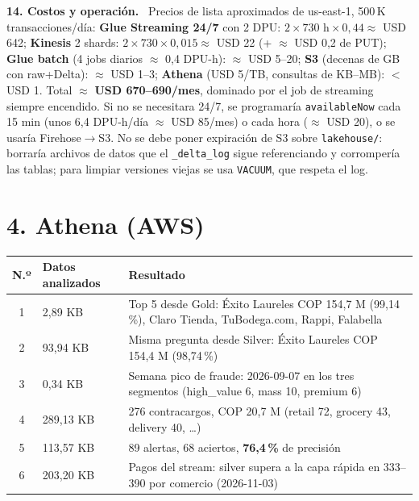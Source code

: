 \documentclass[10pt,a4paper]{article}
\newcommand{\q}[1]{\par\smallskip\textbf{#1}\ }
\newcommand{\code}[1]{\texttt{\small #1}}
\begin{document}
\q{14. Costos y operación.} Precios de lista aproximados de us-east-1, 500\,K transacciones/día: \textbf{Glue Streaming 24/7} con 2 DPU: $2\times730\text{ h}\times0{,}44\approx$ USD 642; \textbf{Kinesis} 2 shards: $2\times730\times0{,}015\approx$ USD 22 (+ $\approx$ USD 0,2 de PUT); \textbf{Glue batch} (4 jobs diarios $\approx$ 0,4 DPU-h): $\approx$ USD 5--20; \textbf{S3} (decenas de GB con raw+Delta): $\approx$ USD 1--3; \textbf{Athena} (USD 5/TB, consultas de KB--MB): $<$ USD 1. Total $\approx$ \textbf{USD 670--690/mes}, dominado por el job de streaming siempre encendido. Si no se necesitara 24/7, se programaría \code{availableNow} cada 15 min (unos 6,4 DPU-h/día $\approx$ USD 85/mes) o cada hora ($\approx$ USD 20), o se usaría Firehose$\to$S3. No se debe poner expiración de S3 sobre \code{lakehouse/}: borraría archivos de datos que el \code{\_delta\_log} sigue referenciando y corrompería las tablas; para limpiar versiones viejas se usa \code{VACUUM}, que respeta el log.

\section*{4. Athena (AWS)}
\begin{center}\small
\begin{tabular}{@{}clp{8.6cm}@{}}\toprule
\textbf{N.º} & \textbf{Datos analizados} & \textbf{Resultado}\\\midrule
1 & 2,89 KB & Top 5 desde Gold: Éxito Laureles COP 154,7 M (99,14\,\%), Claro Tienda, TuBodega.com, Rappi, Falabella\\
2 & 93,94 KB & Misma pregunta desde Silver: Éxito Laureles COP 154,4 M (98,74\,\%)\\
3 & 0,34 KB & Semana pico de fraude: 2026-09-07 en los tres segmentos (high\_value 6, mass 10, premium 6)\\
4 & 289,13 KB & 276 contracargos, COP 20,7 M (retail 72, grocery 43, delivery 40, \dots)\\
5 & 113,57 KB & 89 alertas, 68 aciertos, \textbf{76,4\,\%} de precisión\\
6 & 203,20 KB & Pagos del stream: silver supera a la capa rápida en 333--390 por comercio (2026-11-03)\\\bottomrule
\end{tabular}
\end{center}
\end{document}
